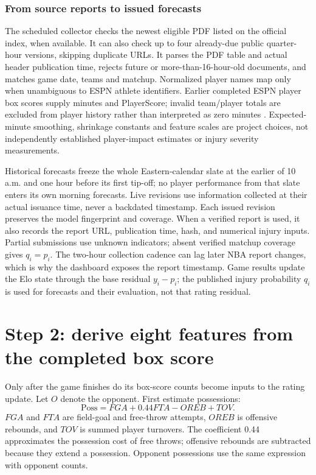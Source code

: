 \documentclass[11pt]{article}
\begin{document}
\subsubsection{From source reports to issued forecasts}
The scheduled collector checks the newest eligible PDF listed on the
official index, when available. It can also check up to four already-due
public quarter-hour versions, skipping duplicate URLs. It parses the PDF table and actual header publication time,
rejects future or more-than-16-hour-old documents, and matches game date,
teams and matchup. Normalized player names map only when unambiguous to
ESPN athlete identifiers. Earlier completed ESPN player box scores supply
minutes and PlayerScore; invalid team/player totals are excluded from player
history rather than interpreted as zero minutes \cite{espn,sportsdataverse}.
Expected-minute smoothing, shrinkage constants and feature scales are project choices, not independently established player-impact
estimates or injury severity measurements.

Historical forecasts freeze the whole Eastern-calendar slate at the earlier
of 10 a.m. and one hour before its first tip-off; no player performance from
that slate enters its own morning forecasts. Live revisions use information
collected at their actual issuance time, never a backdated timestamp.
Each issued revision preserves the model fingerprint and coverage. When
a verified report is used, it also records the report URL, publication
time, hash, and numerical injury inputs. Partial submissions
use unknown indicators; absent verified matchup coverage gives $q_i=p_i$.
The two-hour collection cadence can lag later NBA report changes, which is
why the dashboard exposes the report timestamp. Game results update the Elo
state through the base residual $y_i-p_i$; the published injury probability
$q_i$ is used for forecasts and their evaluation, not that rating residual.

\section{Step 2: derive eight features from the completed box score}\label{sec:features}
Only after the game finishes do its box-score counts become inputs to the
rating update. Let $O$ denote the opponent. First estimate possessions:
\begin{equation}\label{eq:possessions}
 \mathrm{Poss}=FGA+0.44FTA-OREB+TOV.
\end{equation}
$FGA$ and $FTA$ are field-goal and free-throw attempts, $OREB$ is offensive
rebounds, and $TOV$ is summed player turnovers. The coefficient 0.44
approximates the possession cost of free throws; offensive rebounds are
subtracted because they extend a possession. Opponent possessions use the
same expression with opponent counts.
\end{document}
